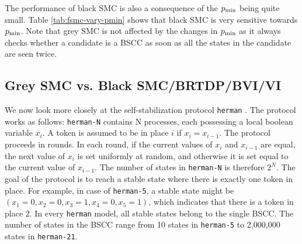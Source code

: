 The performance of black SMC is also a consequence of the $p_{\min}$ being quite small. 
Table \ref{tab:fsmc-vary-pmin} shows that black SMC is very sensitive towards $p_{\min}$.
Note that grey SMC is not affected by the changes in $p_{\min}$ as it always checks whether a candidate is a BSCC as soon as all the states in the candidate are seen twice.





\subsection{Grey SMC vs. Black SMC/BRTDP/BVI/VI}



We now look more closely at the self-stabilization protocol \texttt{herman} \cite{HermanPrism,Herman90}. 
The protocol works as follows:
\texttt{herman-N} contains N processes, each possessing a local boolean variable $x_i$. 
A token is assumed to be in place $i$ if $x_i = x_{i-1}$.
The protocol proceeds in rounds.
In each round, if the current values of $x_i$ and $x_{i-1}$ are equal, the next value of $x_i$ is set uniformly at random, and otherwise it is set equal to the current value of $x_{i-1}$.
The number of states in \texttt{herman-N} is therefore $2^N$.
The goal of the protocol is to reach a stable state where there is exactly one token in place. 
For example, in case of \texttt{herman-5}, a stable state might be $(x_1=0, x_2=0, x_3=1, x_4=0, x_5=1)$, which indicates that there is a token in place 2. 
In every \texttt{herman} model, all stable states belong to the single BSCC. 
The number of states in the BSCC range from 10 states in \texttt{herman-5} to 2,000,000 states in \texttt{herman-21}.

